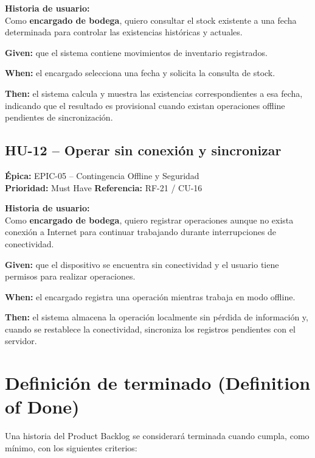 \documentclass[11pt,a4paper]{article}
\begin{document}
\medskip
\textbf{Historia de usuario:}\\
Como \textbf{encargado de bodega}, quiero consultar el stock existente a una fecha determinada
para controlar las existencias históricas y actuales.

\begin{tcolorbox}[colback=lightblue,colframe=uteqblue,title=\textbf{BDD -- Criterio de aceptación}]
\textbf{Given:} que el sistema contiene movimientos de inventario registrados.

\medskip
\textbf{When:} el encargado selecciona una fecha y solicita la consulta de stock.

\medskip
\textbf{Then:} el sistema calcula y muestra las existencias correspondientes a esa fecha,
indicando que el resultado es provisional cuando existan operaciones offline pendientes de sincronización.
\end{tcolorbox}

\subsection{HU-12 -- Operar sin conexión y sincronizar}
\textbf{Épica:} EPIC-05 -- Contingencia Offline y Seguridad\\
\textbf{Prioridad:} Must Have \quad \textbf{Referencia:} RF-21 / CU-16

\medskip
\textbf{Historia de usuario:}\\
Como \textbf{encargado de bodega}, quiero registrar operaciones aunque no exista conexión
a Internet para continuar trabajando durante interrupciones de conectividad.

\begin{tcolorbox}[colback=lightblue,colframe=uteqblue,title=\textbf{BDD -- Criterio de aceptación}]
\textbf{Given:} que el dispositivo se encuentra sin conectividad y el usuario tiene permisos
para realizar operaciones.

\medskip
\textbf{When:} el encargado registra una operación mientras trabaja en modo offline.

\medskip
\textbf{Then:} el sistema almacena la operación localmente sin pérdida de información y,
cuando se restablece la conectividad, sincroniza los registros pendientes con el servidor.
\end{tcolorbox}

\newpage
\section{Definición de terminado (Definition of Done)}
Una historia del Product Backlog se considerará terminada cuando cumpla, como mínimo, con
los siguientes criterios:
\end{document}
